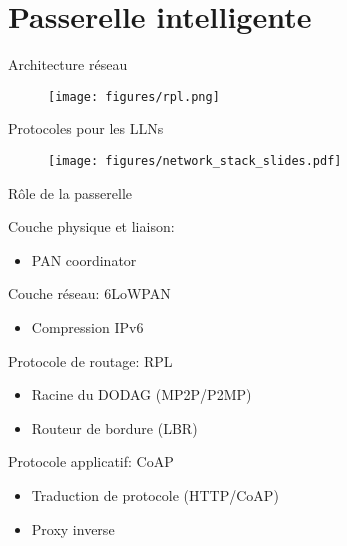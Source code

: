 \section{Passerelle intelligente}

\begin{frame}{Architecture réseau}
  \begin{figure}
    \centering
    \texttt{[image: figures/rpl.png]}
  \end{figure}
\end{frame}

\begin{frame}{Protocoles pour les LLNs}
  \begin{figure}
    \centering
    \texttt{[image: figures/network\_stack\_slides.pdf]}
  \end{figure}
  

\end{frame}

\begin{frame}{Rôle de la passerelle}
  \begin{block}{Couche physique et liaison: \ieee{}}
    \begin{itemize}
      \item PAN coordinator
    \end{itemize}
  \end{block}
  \begin{block}{Couche réseau: 6LoWPAN}
    \begin{itemize}
      \item Compression IPv6
    \end{itemize}
  \end{block}
  \begin{alertblock}{Protocole de routage: RPL}
    \begin{itemize}
      \item Racine du DODAG (MP2P/P2MP)
      \item Routeur de bordure (LBR)
    \end{itemize}
  \end{alertblock}
  \begin{alertblock}{Protocole applicatif: CoAP}
    \begin{itemize}
      \item Traduction de protocole (HTTP/CoAP)
      \item Proxy inverse
    \end{itemize}
  \end{alertblock}
\end{frame}

